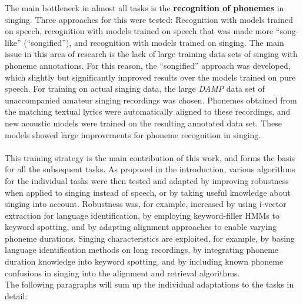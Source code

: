 The main bottleneck in almost all tasks is the \textbf{recognition of phonemes} in singing. Three approaches for this were tested: Recognition with models trained on speech, recognition with models trained on speech that was made more ``song-like'' (``songified''), and recognition with models trained on singing. The main issue in this area of research is the lack of large training data sets of singing with phoneme annotations. For this reason, the ``songified'' approach was developed, which slightly but significantly improved results over the models trained on pure speech. For training on actual singing data, the large \textit{DAMP} data set of unaccompanied amateur singing recordings was chosen. Phonemes obtained from the matching textual lyrics were automatically aligned to these recordings, and new acoustic models were trained on the resulting annotated data set. These models showed large improvements for phoneme recognition in singing.\\\\
This training strategy is the main contribution of this work, and forms the basis for all the subsequent tasks. As proposed in the introduction, various algorithms for the individual tasks were then tested and adapted by improving robustness when applied to singing instead of speech, or by taking useful knowledge about singing into account. Robustness was, for example, increased by using i-vector extraction for language identification, by employing keyword-filler HMMs to keyword spotting, and by adapting alignment approaches to enable varying phoneme durations. Singing characteristics are exploited, for example, by basing language identification methods on long recordings, by integrating phoneme duration knowledge into keyword spotting, and by including known phoneme confusions in singing into the alignment and retrieval algorithms.\\
The following paragraphs will sum up the individual adaptations to the tasks in detail:\\

